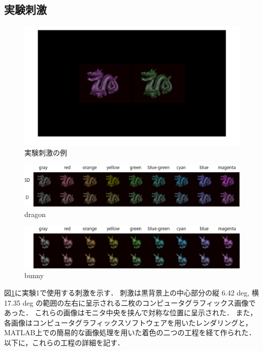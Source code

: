     \subsection{実験刺激}

        \begin{figure}[h]
            \centering
            \includegraphics[width=14.0cm]{./img/ex1_stimuli.png}
            \caption{実験刺激の例}
            \label{ex1_stimuli}
        \end{figure}
        
        \begin{figure}[h]
            \centering
            \includegraphics[width=14.0cm]{./img/ex1_stimuli_d_p.png}
            \caption{dragon}
            \label{ex1_stimuli_d}
        \end{figure}

        \begin{figure}[h]
            \centering
            \includegraphics[width=14.0cm]{./img/ex1_stimuli_b_p.png}
            \caption{bunny}
            \label{ex1_stimuli_b}
        \end{figure}

        図\ref{ex1_stimuli}に実験1で使用する刺激を示す．
        刺激は黒背景上の中心部分の縦 6.42 deg, 横 17.35 deg の範囲の左右に呈示される二枚のコンピュータグラフィックス画像であった．
        これらの画像はモニタ中央を挟んで対称な位置に呈示された．
        また，各画像はコンピュータグラフィックスソフトウェアを用いたレンダリングと，MATLAB上での簡易的な画像処理を用いた着色の二つの工程を経て作られた．
        以下に，これらの工程の詳細を記す．

